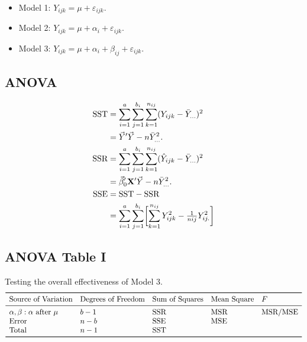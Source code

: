\begin{itemize}
    \item Model 1: $ Y_{ijk}=\mu+\varepsilon_{ijk} $.
    \item Model 2: $ Y_{ijk}=\mu+\alpha_i+\varepsilon_{ijk} $.
    \item Model 3: $ Y_{ijk}=\mu+\alpha_i+\beta_{ij}+\varepsilon_{ijk} $.
\end{itemize}
\subsection*{ANOVA}
\begin{align*}
    \text{SST}
     & =\sum_{i=1}^{a}\sum_{j=1}^{b_i}\sum_{k=1}^{n_{ij}}(Y_{ijk}-\bar{Y}_{...})^2                         \\
     & =\vec{Y}'\vec{Y}-n\bar{Y}_{...}^2.                                                            \\
    \text{SSR}
     & =\sum_{i=1}^{a}\sum_{j=1}^{b_i}\sum_{k=1}^{n_{ij}}(\hat{Y}_{ijk}-\bar{Y}_{...})^2                   \\
     & =\vec{\beta}_0'\mathbf{X}'\vec{Y}-n\bar{Y}_{...}^2.                                           \\
    \text{SSE}
     & =\text{SST}-\text{SSR}                                                                                          \\
     & =\sum_{i=1}^{a}\sum_{j=1}^{b_i}\biggl[\sum_{k=1}^{n_{ij}}Y_{ijk}^2-\tfrac{1}{n{ij}}Y_{ij.}^2\biggr]
\end{align*}
\subsection*{ANOVA Table I}
Testing the overall effectiveness of Model 3.
\[ \begin{array}{lllll}
        \toprule
        \text{Source of Variation}           & \text{Degrees of Freedom} & \text{Sum of Squares} & \text{Mean Square} & F         \\
        \midrule
        \alpha,\beta:\alpha\text{ after }\mu & b-1                       & \SSR                  & \MSR               & \MSR/\MSE \\
        \text{Error}                         & n-b                       & \SSE                  & \MSE                           \\
        \text{Total}                         & n-1                       & \SST                                                   \\
        \bottomrule
    \end{array} \]
